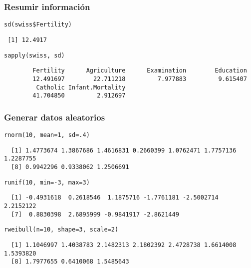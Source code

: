 \documentclass{beamer}
\begin{document}
\begin{frame}[fragile]
\frametitle{Resumir información}
\label{sec-2-2}



\lstset{language=R}
\begin{lstlisting}
sd(swiss$Fertility)
\end{lstlisting}

\begin{verbatim}
 [1] 12.4917
\end{verbatim}


\lstset{language=R}
\begin{lstlisting}
sapply(swiss, sd)
\end{lstlisting}

\begin{verbatim}
        Fertility      Agriculture      Examination        Education 
        12.491697        22.711218         7.977883         9.615407 
         Catholic Infant.Mortality 
        41.704850         2.912697
\end{verbatim}
\end{frame}
\begin{frame}[fragile]
\frametitle{Generar datos aleatorios}
\label{sec-2-3}



\lstset{language=R}
\begin{lstlisting}
rnorm(10, mean=1, sd=.4)
\end{lstlisting}

\begin{verbatim}
  [1] 1.4773674 1.3867686 1.4616831 0.2660399 1.0762471 1.7757136 1.2287755
  [8] 0.9942296 0.9338062 1.2506691
\end{verbatim}


\lstset{language=R}
\begin{lstlisting}
runif(10, min=-3, max=3)
\end{lstlisting}

\begin{verbatim}
  [1] -0.4931618  0.2618546  1.1875716 -1.7761181 -2.5002714  2.2152122
  [7]  0.8830398  2.6895999 -0.9841917 -2.8621449
\end{verbatim}


\lstset{language=R}
\begin{lstlisting}
rweibull(n=10, shape=3, scale=2)
\end{lstlisting}

\begin{verbatim}
  [1] 1.1046997 1.4038783 2.1482313 2.1802392 2.4728738 1.6614008 1.5393820
  [8] 1.7977655 0.6410068 1.5485643
\end{verbatim}
\end{frame}
\end{document}
